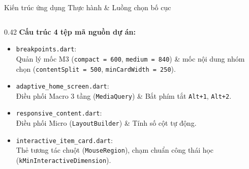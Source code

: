 \documentclass[aspectratio=169, 10pt]{beamer}
\begin{document}
\begin{frame}{Kiến trúc ứng dụng Thực hành \& Luồng chọn bố cục}
  \vspace{-0.1cm}
  \begin{columns}[T]
    \begin{column}{0.42\textwidth}
      \small
      \textbf{Cấu trúc 4 tệp mã nguồn dự án:}
      \vskip 0.12cm
      \footnotesize
      \begin{itemize}\setlength{\itemsep}{3pt}
        \item \texttt{breakpoints.dart}:\\
        Quản lý mốc M3 (\texttt{compact = 600}, \texttt{medium = 840}) \& mốc nội dung nhóm chọn (\texttt{contentSplit = 500}, \texttt{minCardWidth = 250}).
        \item \texttt{adaptive\_home\_screen.dart}:\\
        Điều phối Macro 3 tầng (\texttt{MediaQuery}) \& Bắt phím tắt \texttt{Alt+1}, \texttt{Alt+2}.
        \item \texttt{responsive\_content.dart}:\\
        Điều phối Micro (\texttt{LayoutBuilder}) \& Tính số cột tự động.
        \item \texttt{interactive\_item\_card.dart}:\\
        Thẻ tương tác chuột (\texttt{MouseRegion}), chạm chuẩn công thái học (\texttt{kMinInteractiveDimension}).
      \end{itemize}
    \end{column}


\end{columns}
\end{frame}
\end{document}
